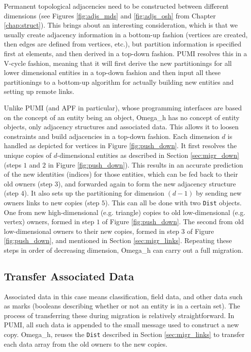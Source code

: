 Permanent topological adjacencies need to be constructed
between different dimensions (see Figures \ref{fig:adjs_mds} and
\ref{fig:adjs_osh} from Chapter \ref{chap:struct}).
This brings about an interesting consideration, which is that we
usually create adjacency information in a bottom-up fashion (vertices
are created, then edges are defined from vertices, etc.), but
partition information is specified first at elements, and then
derived in a top-down fashion.
PUMI resolves this in a V-cycle fashion, meaning that it will first
derive the new partitionings for all lower dimensional entities in a top-down
fashion and then input all these partitionings to a bottom-up algorithm
for actually building new entities and setting up remote links.

Unlike PUMI (and APF in particular), whose programming interfaces are based on the
concept of an entity being an object, Omega\_h has no concept of entity
objects, only adjacency structures and associated data.
This allows it to loosen constraints and build adjacencies in a top-down fashion.
Each dimension $d$ is handled as depicted for vertices in Figure \ref{fig:push_down}.
It first resolves the unique copies of
$d$-dimensional entities as described in Section \ref{sec:migr_down}
(steps $1$ and $2$ in Figure \ref{fig:push_down}).
This results in an accurate prediction of the new identities (indices)
for those entities, which can be fed back to
their old owners (step $3$), and forwarded
again to form the new adjacency structure (step $4$).
It also sets up the partitioning for dimension $(d-1)$ by sending
new owners links to new copies (step $5$).
This can all be done with two \texttt{Dist} objects.
One from new
high-dimensional (e.g. triangle) copies to old low-dimensional (e.g. vertex) owners,
formed in step $1$ of Figure \ref{fig:push_down}.
The second from old low-dimensional owners to their new copies,
formed in step $3$ of Figure \ref{fig:push_down}, and
mentioned in Section \ref{sec:migr_links}.
Repeating these steps in order of decreasing dimension, Omega\_h
can carry out a full migration.

\subsection{Transfer Associated Data}

Associated data in this case means classification, field data,
and other data such as marks (booleans describing whether or not
an entity is in a certain set).
The process of transferring these during migration is relatively
straightforward.
In PUMI, all such data is appended to the small message used
to construct a new copy.
Omega\_h, reuses the \texttt{Dist} described in Section \ref{sec:migr_links}
to transfer each data array from the old owners to the new copies.

